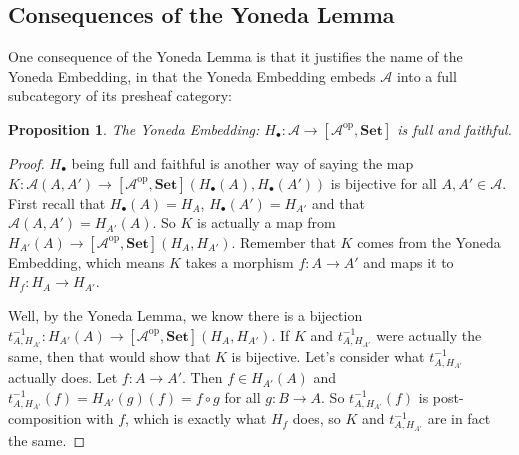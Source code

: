 \documentclass[11pt]{article}
\theoremstyle{definition}
\theoremstyle{definition}
\theoremstyle{plain}
\theoremstyle{plain}
\newtheorem{prop}{Proposition}
\theoremstyle{plain}
\begin{document}
\subsection*{Consequences of the Yoneda Lemma}

One consequence of the Yoneda Lemma is that it justifies the name of the Yoneda Embedding, in that the Yoneda Embedding embeds $\mathscr{A}$ into a full subcategory of its presheaf category:

\begin{prop}
The Yoneda Embedding: $H_{\bullet}: \mathscr{A} \to [\mathscr{A}^{\text{op}}, \textbf{Set}]$ is full and faithful.
\end{prop}

\begin{proof}
$H_{\bullet}$ being full and faithful is another way of saying the map $K: \mathscr{A}(A,A') \to [\mathscr{A}^{\text{op}}, \textbf{Set}](H_{\bullet}(A), H_{\bullet}(A'))$ is bijective for all $A,A' \in \mathscr{A}$. First recall that $H_{\bullet}(A) = H_A$, $H_{\bullet}(A') = H_{A'}$ and that $\mathscr{A}(A,A') = H_{A'}(A)$. So $K$ is actually a map from $H_{A'}(A) \to [\mathscr{A}^{\text{op}}, \textbf{Set}](H_A, H_{A'})$. Remember that $K$ comes from the Yoneda Embedding, which means $K$ takes a morphism $f: A \to A'$ and maps it to $H_f: H_A \to H_{A'}$.

Well, by the Yoneda Lemma, we know there is a bijection $t_{A,H_{A'}}^{-1}: H_{A'}(A) \to [\mathscr{A}^{\text{op}}, \textbf{Set}](H_A, H_{A'})$. If $K$ and $t_{A,H_{A'}}^{-1}$ were actually the same, then that would show that $K$ is bijective. Let's consider what $t_{A, H_{A'}}^{-1}$ actually does. Let $f: A \to A'$. Then $f \in H_{A'}(A)$ and $t_{A,H_{A'}}^{-1}(f) = H_{A'}(g)(f) = f \circ g$ for all $g: B \to A$. So $t_{A,H_{A'}}^{-1}(f)$ is post-composition with $f$, which is exactly what $H_f$ does, so $K$ and $t_{A,H_{A'}}^{-1}$ are in fact the same.
\end{proof}

\nocite{*}


\end{document}
